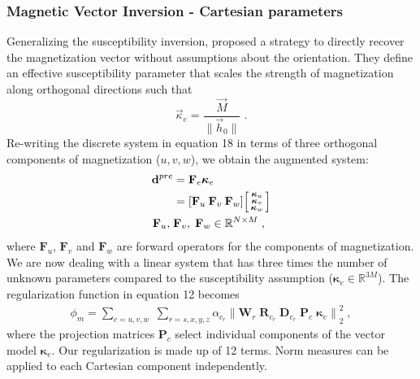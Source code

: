 \documentclass[paper]{geophysics}
\begin{document}
\subsubsection{Magnetic Vector Inversion - Cartesian parameters}
Generalizing the susceptibility inversion, \cite{LelievreOldenburg2009}
proposed a strategy to directly recover the magnetization vector without assumptions about the orientation. They define an effective susceptibility parameter that scales the strength of magnetization along orthogonal directions such that
\begin{equation}
\vec \kappa_e = \frac{\vec{M}}{\|\vec{h}_0\|} \;.
\end{equation}
Re-writing the discrete system in equation 18 in terms of three orthogonal components of magnetization ($u, v, w$), we obtain the augmented system:
\begin{equation}\label{MVIlinear}
\begin{split}
\mathbf{d}^{pre} &= \mathbf{F}_{e} \boldsymbol{\kappa}_e \\
&= [ \mathbf{F}_u \: \mathbf{F}_v \: \mathbf{F}_w]
\begin{bsmallmatrix}
\boldsymbol{\kappa}_{u}\\
\boldsymbol{\kappa}_{v}\\
\boldsymbol{\kappa}_{w}
\end{bsmallmatrix} \\
\mathbf{F}_u,\; &\mathbf{F}_v, \;\mathbf{F}_w \in \mathbb{R}^{N \times M} \;,
\end{split}
\end{equation}
where $\mathbf{F}_u$, $\mathbf{F}_v$ and $\mathbf{F}_w$ are forward operators for the components of magnetization.
We are now dealing with a linear system that has three times the number of unknown parameters compared to the susceptibility assumption ($\boldsymbol{\kappa}_e \in \mathbb{R}^{3M}$). The regularization function in equation 12 becomes
\begin{equation} \label{phi_m_sparse_3C}
\begin{split}
\phi_m = \sum_{c = u,v,w} \;
\sum_{r = s,x,y,z} \alpha_{c_r} {\|\mathbf{W}_r \;\mathbf{R}_{c_r} \; \mathbf{D}_{c_r} \;\mathbf{P}_{c} \; \boldsymbol{\kappa}_e\|}^2_2 \;,
\end{split}
\end{equation}
where the projection matrices $\mathbf{P}_{c}$ select individual components of the vector model $\boldsymbol{\kappa}_e$. Our regularization is made up of 12 terms. Norm measures can be applied to each Cartesian component independently.
\end{document}
